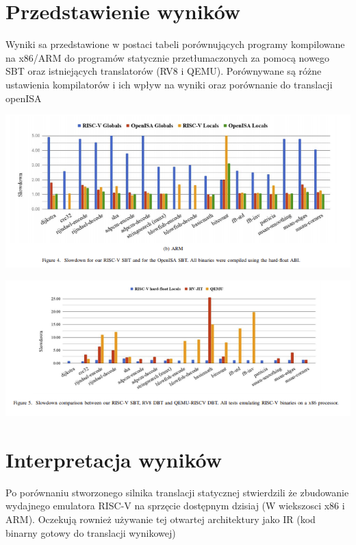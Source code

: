 \documentclass[11pt]{article}
\begin{document}
\section{Przedstawienie wyników}
\label{sec:orgd8e2e17}
Wyniki sa przedstawione w postaci tabeli porównujących programy kompilowane na x86/ARM do programów statycznie przetłumaczonych za pomocą nowego SBT oraz istniejących translatorów (RV8 i QEMU). Porównywane są różne ustawienia kompilatorów i ich wpływ na wyniki oraz porównanie do translacji openISA
\begin{center}
\includegraphics[width=.9\linewidth]{./figure4.png}
\end{center}
\begin{center}
\includegraphics[width=.9\linewidth]{./figure5.png}
\end{center}
\section{Interpretacja wyników}
\label{sec:orga1773f9}
Po porównaniu stworzonego silnika translacji statycznej stwierdzili że zbudowanie wydajnego emulatora RISC-V na sprzęcie dostępnym dzisiaj (W wiekszosci x86 i ARM). Oczekują rownież używanie tej otwartej architektury jako IR (kod binarny gotowy do translacji wynikowej)
\end{document}
